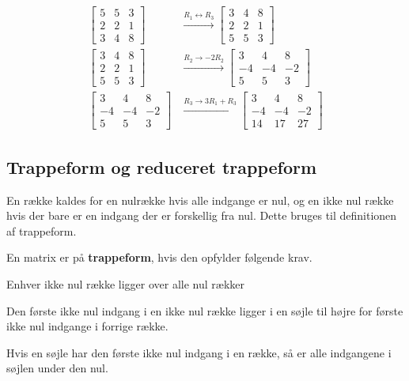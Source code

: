\begin{eks}\label{eks1}
\begin{align*}
\begin{bmatrix}
5 & 5 & 3 \\
2 & 2 & 1\\
3 & 4 & 8
\end{bmatrix}
&\xrightarrow{R_1 \leftrightarrow R_3}
\begin{bmatrix}
3 & 4 & 8\\
2 & 2 & 1\\
5 & 5 & 3
\end{bmatrix}\\
%
%
\begin{bmatrix}
3 & 4 & 8\\
2 & 2 & 1\\
5 & 5 & 3
\end{bmatrix}
&\xrightarrow{R_2 \rightarrow -2R_2}
\begin{bmatrix}
3 & 4 & 8\\
-4 & -4 & -2\\
5 & 5 & 3
\end{bmatrix}\\
\begin{bmatrix}
3 & 4 & 8\\
-4 & -4 & -2\\
5 & 5 & 3
\end{bmatrix}
&\xrightarrow{R_3 \rightarrow 3R_1+R_3}
\begin{bmatrix}
3 & 4 & 8\\
-4 & -4 & -2\\
14 & 17 & 27
\end{bmatrix}
\end{align*}
\end{eks}


\subsection{Trappeform og reduceret trappeform}
En række kaldes for en nulrække hvis alle indgange er nul, og en ikke nul række hvis der bare er en indgang der er forskellig fra nul.
Dette bruges til definitionen af trappeform.
\begin{defn}{}{}
En matrix er på \textbf{trappeform}, hvis den opfylder følgende krav.
\itemize
\item Enhver ikke nul række ligger over alle nul rækker
\item Den første ikke nul indgang i en ikke nul række ligger i en søjle til højre for første ikke nul indgange i forrige række.
\item Hvis en søjle har den første ikke nul indgang i en række, så er alle indgangene i søjlen under den nul.
\end{defn}

